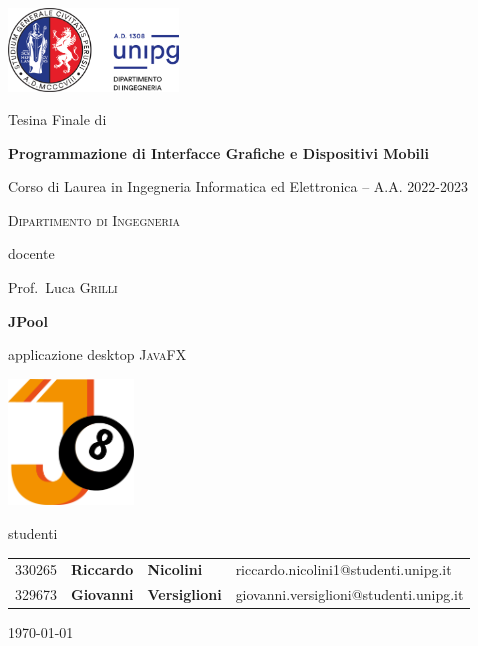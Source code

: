 \documentclass[12pt,a4paper]{report}
\begin{document}

\begin{titlepage} %
	\centering
	
	\includegraphics[width=0.34\textwidth]{logo-unipg}\par\vspace{1cm}
	
	\large{Tesina Finale di}\par
	\large{\textbf{Programmazione di Interfacce Grafiche e Dispositivi Mobili}}\par
	\small{Corso di Laurea in Ingegneria Informatica ed Elettronica -- A.A. 2022-2023}\par
	\textsc{\small{Dipartimento di Ingegneria}}\par

	\vspace{0.5cm}
	docente\par
	Prof.~Luca \textsc{Grilli}

	\vspace{1cm}
	\textbf{\huge{JPool}}\par
	\vspace{0.2cm}
	applicazione desktop \textsc{JavaFX}\par
	
	\vspace{0.5cm}
	\includegraphics[width=0.25\textwidth]{Logo.png}\par\vspace{1cm}
	
	\vspace{1cm}
	\large{studenti}\par
	\vspace{0.2cm}
	\begin{tabular}{ l l l l }
	\large{330265} & \large{\textbf{Riccardo}} & \large{\textbf{Nicolini}} & \large{riccardo.nicolini1@studenti.unipg.it}\\
	\large{329673} & \large{\textbf{Giovanni}} & \large{\textbf{Versiglioni}} & \large{giovanni.versiglioni@studenti.unipg.it}\\
	\end{tabular}

	\vfill
	\raggedright
	\small{\today}
\end{titlepage} %
\restoregeometry
\end{document}
